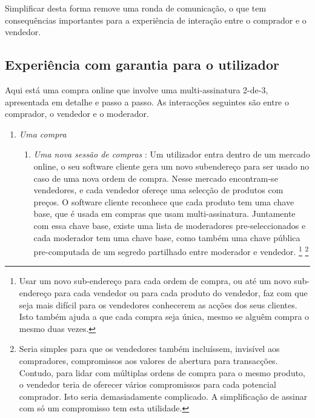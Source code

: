 Simplificar desta forma remove uma ronda de comunicação, o que tem consequências importantes para a experiência de interação entre o comprador e o vendedor. 


\subsection{Experiência com garantia para o utilizador}
\label{subsec:escrowed-marketplace-escrow-user-experience}

Aqui está uma compra online que involve uma multi-assinatura 2-de-3, apresentada em detalhe e passo a passo. As interacções seguintes são entre o comprador, o vendedor e o moderador.
\begin{enumerate}
    \item {\em Uma compra}
    \begin{enumerate}
        \item {\em Uma nova sessão de compras} : Um utilizador entra dentro de um mercado online, o seu software cliente gera um novo subendereço para ser usado no caso de uma nova ordem de compra. Nesse mercado encontram-se vendedores, e cada vendedor ofereçe uma selecção de produtos com preços. O software cliente reconhece que cada produto tem uma chave base, que é usada em compras que usam multi-assinatura. Juntamente com essa chave base, existe uma lista de moderadores pre-seleccionados e cada moderador tem uma chave base, como também uma chave pública pre-computada de um segredo partilhado entre moderador e vendedor.
\footnote{Usar um novo sub-endereço para cada ordem de compra, ou até um novo sub-endereço para cada vendedor ou para cada produto do vendedor, faz com que seja mais difícil para os vendedores conhecerem as acções dos seus clientes. Isto também ajuda a que cada compra seja única, mesmo se alguêm compra o mesmo duas vezes.}
\footnote{Seria simples para que os vendedores também incluíssem, invisível aos compradores, compromissos aos valores de abertura para transacções. Contudo, para lidar com múltiplas ordens de compra para o mesmo produto, o vendedor teria de oferecer vários compromissos para cada potencial comprador. Isto seria demasiadamente complicado. A simplificação de assinar com só um compromisso tem esta utilidade.}

\end{enumerate}
\end{enumerate}
